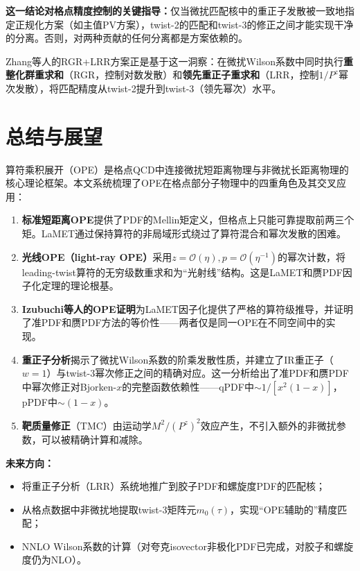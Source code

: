 \documentclass[12pt,a4paper]{ctexart}
\theoremstyle{definition}
\begin{document}
\textbf{这一结论对格点精度控制的关键指导：}仅当微扰匹配核中的重正子发散被一致地指定正规化方案（如主值PV方案），twist-2的匹配和twist-3的修正之间才能实现干净的分离。否则，对两种贡献的任何分离都是方案依赖的。

Zhang等人\cite{Zhang2023RGR}的RGR+LRR方案正是基于这一洞察：在微扰Wilson系数中同时执行\textbf{重整化群重求和}（RGR，控制对数发散）和\textbf{领先重正子重求和}（LRR，控制$1/P^z$幂次发散），将匹配精度从twist-2提升到twist-3（领先幂次）水平。

\section{总结与展望}

算符乘积展开（OPE）是格点QCD中连接微扰短距离物理与非微扰长距离物理的核心理论框架。本文系统梳理了OPE在格点部分子物理中的四重角色及其交叉应用：

\begin{enumerate}
    \item \textbf{标准短距离OPE}提供了PDF的Mellin矩定义，但格点上只能可靠提取前两三个矩\cite{Ji2013Euclidean}。LaMET通过保持算符的非局域形式绕过了算符混合和幂次发散的困难\cite{Ji2017More}。

    \item \textbf{光线OPE（light-ray OPE）}采用$z = \mathcal{O}(\eta), p = \mathcal{O}(\eta^{-1})$的幂次计数，将leading-twist算符的无穷级数重求和为``光射线''结构\cite{Braun2019power}。这是LaMET和赝PDF因子化定理的理论根基。

    \item \textbf{Izubuchi等人的OPE证明}\cite{Izubuchi2018}为LaMET因子化提供了严格的算符级推导，并证明了准PDF和赝PDF方法的等价性——两者仅是同一OPE在不同空间中的实现。

    \item \textbf{重正子分析}\cite{Braun2019power}揭示了微扰Wilson系数的阶乘发散性质，并建立了IR重正子（$w=1$）与twist-3幂次修正之间的精确对应。这一分析给出了准PDF和赝PDF中幂次修正对Bjorken-$x$的完整函数依赖性——qPDF中$\sim 1/[x^2(1-x)]$，pPDF中$\sim (1-x)$。

    \item \textbf{靶质量修正}（TMC）由运动学$M^2/(P^z)^2$效应产生，不引入额外的非微扰参数，可以被精确计算和减除\cite{Braun2019power}。
\end{enumerate}

\textbf{未来方向：}
\begin{itemize}
    \item 将重正子分析（LRR）系统地推广到胶子PDF和螺旋度PDF的匹配核；
    \item 从格点数据中非微扰地提取twist-3矩阵元$m_0(\tau)$，实现``OPE辅助的''精度匹配；
    \item NNLO Wilson系数的计算（对夸克isovector非极化PDF已完成，对胶子和螺旋度仍为NLO）。
\end{itemize}
\end{document}
